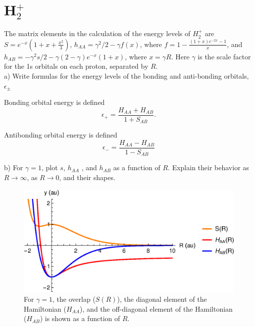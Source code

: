 \documentclass{article}
\begin{document}
\pagebreak

\section*{H$_2^+$}

The matrix elements in the calculation of the energy levels of
$H_2^+$ are $S = e^{-x}(1 +x + \frac{x^2}{3})$, $h_{AA} = \gamma^2/2 - \gamma f(x)$,
where $f = 1-\frac{(1+x)e^{-2x}-1}{x}$, and
$h_{AB}=-\gamma^2s/2 - \gamma(2 - \gamma) e^{-x}(1 + x)$,
where $x = \gamma R$. Here $\gamma$ is the scale factor for the 1s
orbitals on each proton, separated by $R$.
\\

\noindent a) Write formulas for the energy levels of the bonding and anti-bonding orbitals,
$\epsilon_{\pm}$
\\

{\color{blue}
Bonding orbital energy is defined
\begin{equation}
  \epsilon_+ = \frac{H_{AA}+H_{AB}}{1+S_{AB}}.
\end{equation}

Antibonding orbital energy is defined
\begin{equation}
  \epsilon_- = \frac{H_{AA}-H_{AB}}{1-S_{AB}}
\end{equation}
}

\noindent b) For $\gamma=1$, plot $s$, $h_{AA}$ , and $h_{AB}$ as a function
of $R$. Explain their behavior as $R\rightarrow \infty$, as $R\rightarrow 0$,
and their shapes.

\begin{figure}[H]
  \centering
  \includegraphics[scale=0.75]{h2_cation.eps}
  \caption{For $\gamma=1$, the overlap ($S(R)$),
    the diagonal element of the Hamiltonian ($H_{AA}$), and the off-diagonal
    element of the Hamiltonian ($H_{AB}$) is shown as a function of $R$.}
  \label{fig:mat_elem}
\end{figure}
\end{document}
